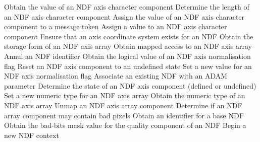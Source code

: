 \begin{latexonly}
  \newpage


\small
{}
            {Obtain the value of an NDF axis character component}
            {Determine the length of an NDF axis character component}
            {Assign the value of an NDF axis character component to a message token}
            {Assign a value to an NDF axis character component}
            {Ensure that an axis coordinate system exists for an NDF}
            {Obtain the storage form of an NDF axis array}
            {Obtain mapped access to an NDF axis array}
            {Annul an NDF identifier}
            {Obtain the logical value of an NDF axis normalisation flag}
            {Reset an NDF axis component to an undefined state}
            {Set a new value for an NDF axis normalisation flag}
            {Associate an existing NDF with an ADAM parameter}
            {Determine the state of an NDF axis component (defined or undefined)}
            {Set a new numeric type for an NDF axis array}
            {Obtain the numeric type of an NDF axis array}
            {Unmap an NDF axis array component}
            {Determine if an NDF array component may contain bad pixels}
            {Obtain an identifier for a base NDF}
            {Obtain the bad-bits mask value for the quality component of an NDF}
            {Begin a new NDF context}

\end{latexonly}
